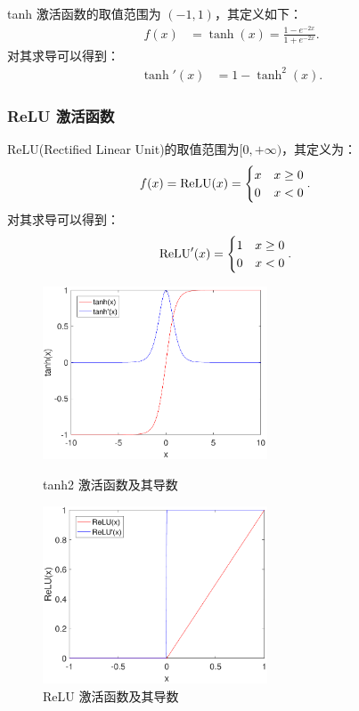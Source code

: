tanh 激活函数的取值范围为 $(-1,1)$，其定义如下：
\begin{align}
f(x)&=\tanh(x)=\frac{1-e^{-2x}}{1+e^{-2x}}.
\end{align}
对其求导可以得到：
\begin{align}
\tanh'(x)&=1-\tanh^2(x).
\end{align}


\subsubsection{ReLU 激活函数}

ReLU(Rectified Linear Unit)的取值范围为$[0,+\infty)$，其定义为：
\begin{align}
f(x)&={\rm ReLU}(x)=\begin{cases}
      x & x\geq 0 \\
      0& x<0
   \end{cases}.
\end{align}
对其求导可以得到：
\begin{align}
{\rm ReLU}'(x)&=\begin{cases}
      1 & x\geq 0 \\
      0 & x<0
   \end{cases}.
\end{align}


\begin{figure}[hbt]
	\centering
	\begin{minipage}{7cm}
		\includegraphics[width=6.67cm]{figures/networks/tanh2}
    \caption{tanh2 激活函数及其导数}
    \label{fig:tanh2}

	\end{minipage}
	\hspace{10pt}
	\begin{minipage}{7cm}
		\includegraphics[width=6.67cm]{figures/networks/ReLU}
    \caption{ReLU 激活函数及其导数}
    \label{fig:ReLU}

	\end{minipage}

\end{figure}

